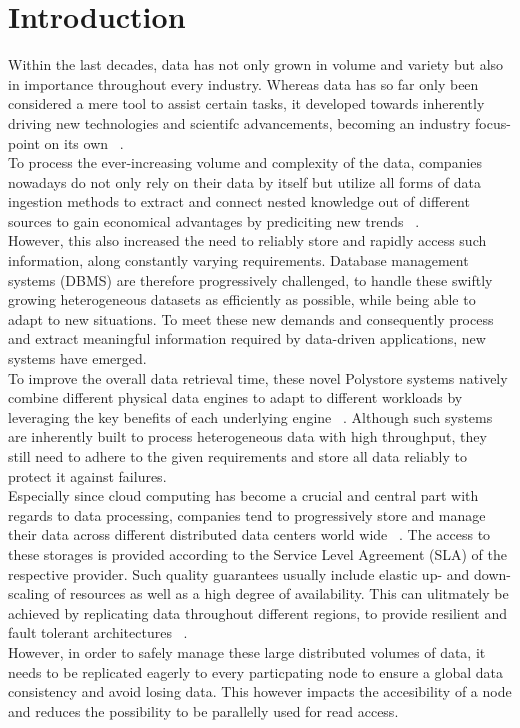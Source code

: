 \chapter{Introduction}
\label{c:intro}

Within the last decades, data has not only grown in volume and variety but also in importance throughout every industry. 
Whereas data has so far only been considered a mere tool to assist certain tasks, it developed towards inherently
driving new technologies and scientifc advancements, becoming an industry focus-point on its own ~\cite{data-driven_2014}.\\
To process the ever-increasing volume and complexity of the data, companies nowadays do not only rely on their data by itself but utilize 
all forms of data ingestion methods to extract and connect nested knowledge out of different sources 
to gain economical advantages by prediciting new trends ~\cite{ingestion_2016}.\\
However, this also increased the need to reliably store and rapidly access such information, along constantly varying requirements.
Database management systems (DBMS) are therefore progressively challenged, to handle these swiftly growing heterogeneous datasets as efficiently as possible,
while being able to adapt to new situations. 
To meet these new demands and consequently process and extract meaningful information required by data-driven applications, new systems have emerged.\\
To improve the overall data retrieval time, these novel Polystore systems natively combine different physical data engines to 
adapt to different workloads by leveraging the key benefits of each underlying engine ~\cite{stonebraker:2005, polypheny2020}. 
Although such systems are inherently built to process heterogeneous data with high throughput, they still need to adhere to the given requirements
and store all data reliably to protect it against failures.\\
Especially since cloud computing has become a crucial and central part with regards to data processing, 
companies tend to progressively store and manage their data across different distributed data centers world wide ~\cite{claremont:2005}. 
The access to these storages is provided according to the Service Level Agreement (SLA) of the respective provider.
Such quality guarantees usually include elastic up- and down-scaling of resources as well as a high degree of availability.
This can ulitmately be achieved by replicating data throughout different regions, to provide resilient and fault tolerant architectures ~\cite{brinkmann:2015, terry:2013}.\\
However, in order to safely manage these large distributed volumes of data, it needs to be replicated eagerly to 
every particpating node to ensure a global data consistency and avoid losing data. 
This however impacts the accesibility of a node and reduces the possibility to be parallelly used for read access.


